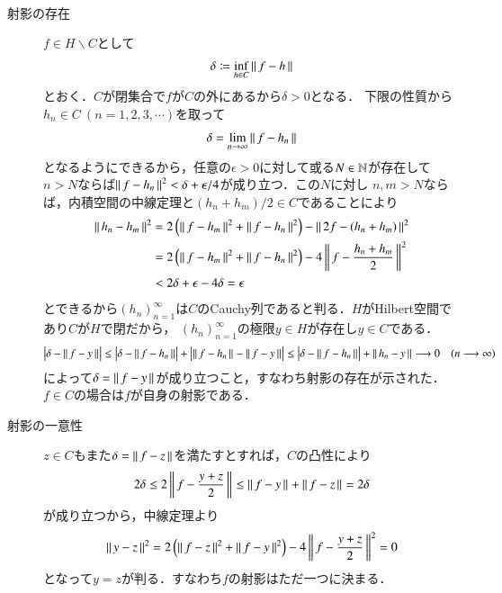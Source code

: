 \begin{itembox}[l]{}
	\begin{thm}[射影定理]
	\end{thm}
\end{itembox}
\begin{prf}\mbox{}\\
	\begin{description}
	\item[射影の存在]
	$f \in H \backslash C$として
	\begin{align}
		\delta \coloneqq \operatorname*{inf}_{h \in C} \left\|\, f - h\, \right\|_{}
	\end{align}
	とおく．$C$が閉集合で$f$が$C$の外にあるから$\delta > 0$となる．
	下限の性質から$h_n \in C\ (n = 1,2,3,\cdots)$を取って
	\begin{align}
		\delta = \lim_{n \to \infty}\left\|\, f - h_n\, \right\|_{}
	\end{align}
	となるようにできるから，任意の$\epsilon > 0$に対して或る$N \in \mathbb{N}$が存在して
	$n> N$ならば$\left\|\, f - h_n\, \right\|_{}^2 < \delta + \epsilon/4$が成り立つ．この$N$に対し
	$n,m > N$ならば，内積空間の中線定理と$(h_n + h_m)/2 \in C$であることにより
	\begin{align}
		\left\|\, h_n - h_m\, \right\|_{}^2 &= 2\left( \left\|\, f - h_m\, \right\|_{}^2 + \left\|\, f - h_n\, \right\|_{}^2 \right) - \left\|\, 2f - (h_n + h_m)\, \right\|_{}^2 \\
		&= 2\left( \left\|\, f - h_m\, \right\|_{}^2 + \left\|\, f - h_n\, \right\|_{}^2 \right) - 4\left\|\, f - \frac{h_n + h_m}{2}\, \right\|_{}^2 \\
		&< 2\delta + \epsilon - 4\delta = \epsilon
	\end{align}
	とできるから$(h_n)_{n=1}^{\infty}$は$C$のCauchy列であると判る．$H$がHilbert空間であり$C$が$H$で閉だから，
	$(h_n)_{n=1}^{\infty}$の極限$y \in H$が存在し$y \in C$である．
	\begin{align}
		\left| \delta - \left\|\, f - y\, \right\|_{} \right| 
		\leq \left| \delta - \left\|\, f - h_n\, \right\|_{} \right| + \left| \left\|\, f - h_n\, \right\|_{} - \left\|\, f - y\, \right\|_{} \right|
		\leq \left| \delta - \left\|\, f - h_n\, \right\|_{} \right| + \left\|\, h_n - y\, \right\|_{}
		\longrightarrow 0 \quad (n \longrightarrow \infty)
	\end{align}
	によって$\delta = \left\|\, f - y\, \right\|_{}$が成り立つこと，すなわち射影の存在が示された．
	$f \in C$の場合は$f$が自身の射影である．

	\item[射影の一意性]
		$z \in C$もまた$\delta = \left\|\, f - z\, \right\|_{}$を満たすとすれば，$C$の凸性により
		\begin{align}
			2 \delta \leq 2\left\|\, f - \frac{y + z}{2}\, \right\|_{} \leq \left\|\, f - y\, \right\|_{} + \left\|\, f - z\, \right\|_{} = 2\delta
		\end{align}
		が成り立つから，中線定理より
		\begin{align}
			\left\|\, y - z\, \right\|_{}^2 = 2\left( \left\|\, f - z\, \right\|_{}^2 + \left\|\, f - y\, \right\|_{}^2 \right) - 4\left\|\, f - \frac{y + z}{2}\, \right\|_{}^2 = 0
		\end{align}
		となって$y = z$が判る．すなわち$f$の射影はただ一つに決まる．
	

\end{description}
\end{prf}
